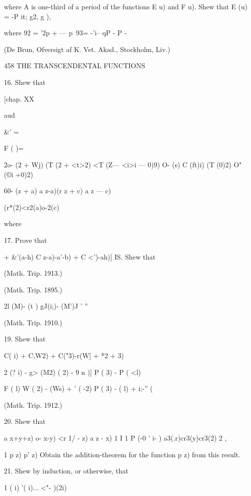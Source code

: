 {where A is one-third of a period of the functions E u) and F u). Shew
that E (u) = -P it; g2, g ),

where 92 = '2p + — p\ 93= -'i-- qP - P -

(De Brun, Ofversigt af K. Vet. Akad., Stockholm, Liv.)



458 THE TRANSCENDENTAL FUNCTIONS

16. Shew that



[chap. XX



aud



\&' =



F ( )=



2o- (2 + Wj) (T (2 + <t>2) <T (Z— <i>i — 0)9) O- (s) C (ft)i) (T (0)2)
O" (©i +0)2)

60- (z + a) a z-a)(r z + c) a z — c)



(r*(2)<r2(a)o-2(c)



where

17. Prove that

+ \&'(a-h) C z-a)-a'-b) + C <')-ah)] IS. Shew that



(Math. Trip. 1913.)



(Math. Trip. 1895.)



2l (M)- (t ) gJ(i;)- (M')J ' ''

(Math. Trip. 1910.)

19. Shew that

C( i) + C,W2) + C("3)-r(W] + *2 + 3)

2 (? i) - g> (M2) ( 2) - 9 n )] P ( 3) - P ( <l)

F ( l) W ( 2) - (Ws) + ' ( -2) P ( 3) - ( l) + i;-'' (%

(Math. Trip. 1912.)

20. Shew that

a x+y+z) o- x-y) <r 1/ - z) a z - x) 1 I 1 P (-0 ' i- )
a3(.r)cr3(y)cr3(2) 2 ,

1 p z) p' z) Obtain the addition-theorem for the function p z) from
this result.

21. Shew by induction, or otherwise, that

1 ( i) '( i)... <"- )(2i)



}
